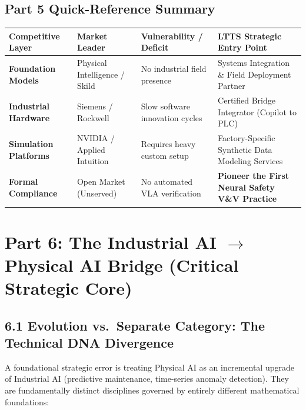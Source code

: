 \documentclass[11pt,a4paper]{article}
\begin{document}
\subsection*{Part 5 Quick-Reference Summary}
\begin{table}[h!]
\centering
\scriptsize
\begin{tabularx}{\textwidth}{@{}l X p{3.2cm} X@{}}
\toprule
\textbf{Competitive Layer} & \textbf{Market Leader} & \textbf{Vulnerability / Deficit} & \textbf{LTTS Strategic Entry Point} \\
\midrule
\textbf{Foundation Models} & Physical Intelligence / Skild & No industrial field presence & Systems Integration \& Field Deployment Partner \\
\textbf{Industrial Hardware} & Siemens / Rockwell & Slow software innovation cycles & Certified Bridge Integrator (Copilot to PLC) \\
\textbf{Simulation Platforms} & NVIDIA / Applied Intuition & Requires heavy custom setup & Factory-Specific Synthetic Data Modeling Services \\
\textbf{Formal Compliance} & Open Market (Unserved) & No automated VLA verification & \textbf{Pioneer the First Neural Safety V\&V Practice} \\
\bottomrule
\end{tabularx}
\end{table}

\section{Part 6: The Industrial AI \texorpdfstring{$\rightarrow$}{to} Physical AI Bridge (Critical Strategic Core)}

\subsection{6.1 Evolution vs.\ Separate Category: The Technical DNA Divergence}
A foundational strategic error is treating Physical AI as an incremental upgrade of Industrial AI (predictive maintenance, time-series anomaly detection). They are fundamentally distinct disciplines governed by entirely different mathematical foundations:
\end{document}
